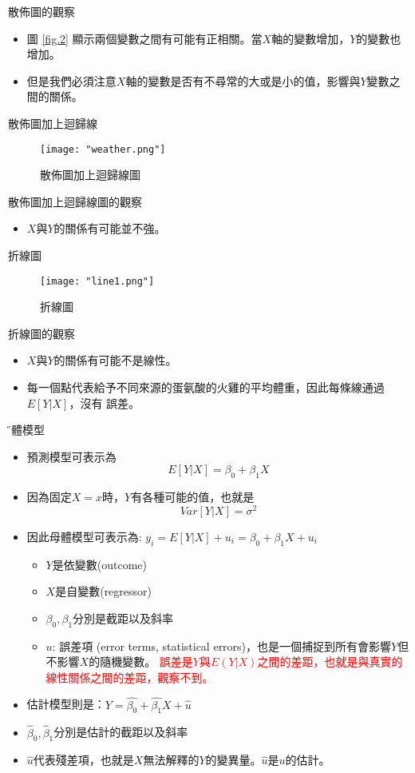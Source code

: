 \documentclass[xcolor=dvipsnames]{beamer}
\begin{document}
\begin{frame}{散佈圖的觀察}
\begin{itemize}
\item 圖 \ref{fig.2} 顯示兩個變數之間有可能有正相關。當$X$軸的變數增加，$Y$的變數也增加。
\item 但是我們必須注意$X$軸的變數是否有不尋常的大或是小的值，影響與$Y$變數之間的關係。
\end{itemize}
\end{frame}
\begin{frame}{散佈圖加上迴歸線}
\begin{figure}
\texttt{[image: "weather.png"]}
\caption{散佈圖加上迴歸線圖}
\label{fig.3}
\end{figure}
\end{frame}
\begin{frame}{散佈圖加上迴歸線圖的觀察}
\begin{itemize}
\item $X$與$Y$的關係有可能並不強。

\end{itemize}
\end{frame}
\begin{frame}{折線圖}
\begin{figure}
\texttt{[image: "line1.png"]}
\caption{折線圖}
\label{fig.4}
\end{figure}
\end{frame}
\begin{frame}{折線圖的觀察}
\begin{itemize}
\item $X$與$Y$的關係有可能不是線性。
\item 每一個點代表給予不同來源的蛋氨酸的火雞的平均體重，因此每條線通過$E[Y|X]$，沒有
誤差。
\end{itemize}
\end{frame}
\begin{frame}{\H 母體模型}
\begin{itemize}
\item 預測模型可表示為 
\[ E[Y|X]=\beta_{0}+\beta_{1}X \]
\item 因為固定$X=x$時，$Y$有各種可能的值，也就是
\[Var[Y|X]=\sigma^2 \]
\item 因此母體模型可表示為: $y_{i}=E[Y|X]+u_{i}=\beta_{0}+\beta_{1}X+u_{i} $
\begin{itemize}
\item $Y$是依變數(outcome)
\item $X$是自變數(regressor)
\item $\beta_{0},\beta_{1}  $分別是截距以及斜率
\item $ u $: 誤差項 (error terms, statistical errors)，也是一個捕捉到所有會影響$Y$但不影響$X$的隨機變數。
\textcolor{red}{\K 誤差是$Y$與$E(Y|X)$之間的差距，也就是與真實的線性關係之間的差距，觀察不到。}
\end{itemize}
\item 估計模型則是：$Y=\hat{\beta_{0}}+\hat{\beta_{1}}X+\hat{u}  $
\item $\hat{\beta}_{0},\hat{\beta}_{1}  $分別是估計的截距以及斜率
\item $\hat{u}$代表殘差項，也就是$X$無法解釋的$Y$的變異量。$\hat{u}$是$u$的估計。
\end{itemize}
\end{frame}
\end{document}
